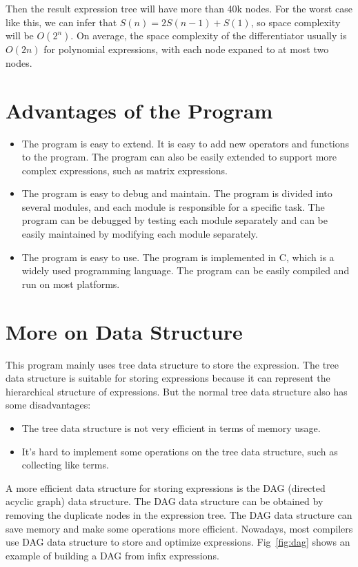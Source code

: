 \documentclass[a4paper,oneside]{book}
\begin{document}
Then the result expression tree will have more than 40k nodes. For the worst case like this, we can infer that $S(n) = 2S(n-1) + S(1)$, so space complexity will be $O(2^n)$. On average, the space complexity of the differentiator usually is $O(2n)$ for polynomial expressions, with each node expaned to at most two nodes.

\section{Advantages of the Program}

\begin{itemize}
    \item The program is easy to extend. It is easy to add new operators and functions to the program. The program can also be easily extended to support more complex expressions, such as matrix expressions.
    \item The program is easy to debug and maintain. The program is divided into several modules, and each module is responsible for a specific task. The program can be debugged by testing each module separately and can be easily maintained by modifying each module separately.
    \item The program is easy to use. The program is implemented in C, which is a widely used programming language. The program can be easily compiled and run on most platforms.
\end{itemize}

\section{More on Data Structure}

This program mainly uses tree data structure to store the expression. The tree data structure is suitable for storing expressions because it can represent the hierarchical structure of expressions. But the normal tree data structure also has some disadvantages:

\begin{itemize}
    \item The tree data structure is not very efficient in terms of memory usage.
    \item It's hard to implement some operations on the tree data structure, such as collecting like terms.
\end{itemize}

A more efficient data structure for storing expressions is the DAG (directed acyclic graph) data structure. The DAG data structure can be obtained by removing the duplicate nodes in the expression tree. The DAG data structure can save memory and make some operations more efficient. Nowadays, most compilers use DAG data structure to store and optimize expressions. Fig~\ref{fig:dag} shows an example of building a DAG from infix expressions.
\end{document}
